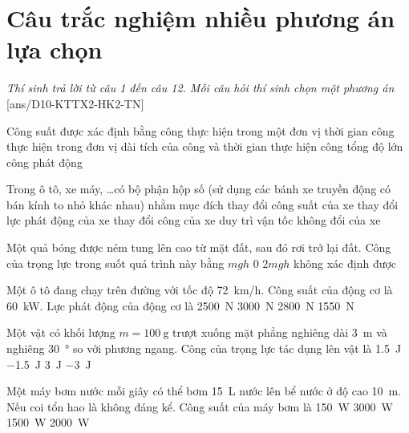 \section{Câu trắc nghiệm nhiều phương án lựa chọn}
\textit{Thí sinh trả lời từ câu 1 đến câu 12. Mỗi câu hỏi thí sinh chọn một phương án}
\setcounter{ex}{0}
[ans/D10-KTTX2-HK2-TN]
\begin{ex}
	Công suất được xác định bằng
	\choice
	{\True công thực hiện trong một đơn vị thời gian}
	{công thực hiện trong đơn vị dài}
	{tích của công và thời gian thực hiện công}
	{tổng độ lớn công phát động}
	\loigiai{}
\end{ex}
\begin{ex}
	Trong ô tô, xe máy, \dots có bộ phận hộp số (sử dụng các bánh xe truyền động có bán kính to nhỏ khác nhau) nhằm mục đích
	\choice
	{thay đổi công suất của xe}
	{\True thay đổi lực phát động của xe}
	{thay đổi công của xe}
	{duy trì vận tốc không đổi của xe}
	\loigiai{}
\end{ex}
\begin{ex}
	Một quả bóng được ném tung lên cao từ mặt đất, sau đó rơi trở lại đất. Công của trọng lực trong suốt quá trình này bằng
	\choice
	{$mgh$}
	{\True $0$}
	{$2mgh$}
	{không xác định được}
	\loigiai{}
\end{ex}
\begin{ex}
	Một ô tô đang chạy trên đường với tốc độ \SI{72}{\kilo\meter/\hour}. Công suất của động cơ là \SI{60}{\kilo\watt}. Lực phát động của động cơ là
	\choice
	{\SI{2500}{\newton}}
	{\True \SI{3000}{\newton}}
	{\SI{2800}{\newton}}
	{\SI{1550}{\newton}}
	\loigiai{}
\end{ex}
\begin{ex}
Một vật có khối lượng $m=\SI{100}{\gram}$ trượt xuống mặt phẳng nghiêng dài \SI{3}{\meter} và nghiêng \SI{30}{\degree} so với phương ngang. Công của trọng lực tác dụng lên vật là
	\choice
	{\True \SI{1.5}{\joule}}
	{\SI{-1.5}{\joule}}
	{\SI{3}{\joule}}
	{\SI{-3}{\joule}}
	\loigiai{}
\end{ex}
\begin{ex}
	Một máy bơm nước mỗi giây có thể bơm \SI{15}{\liter} nước lên bể nước ở độ cao \SI{10}{\meter}. Nếu coi tổn hao là không đáng kể. Công suất của máy bơm là
	\choice
	{\SI{150}{\watt}}
	{\SI{3000}{\watt}}
	{\True \SI{1500}{\watt}}
	{\SI{2000}{\watt}}
	\loigiai{}
\end{ex}
